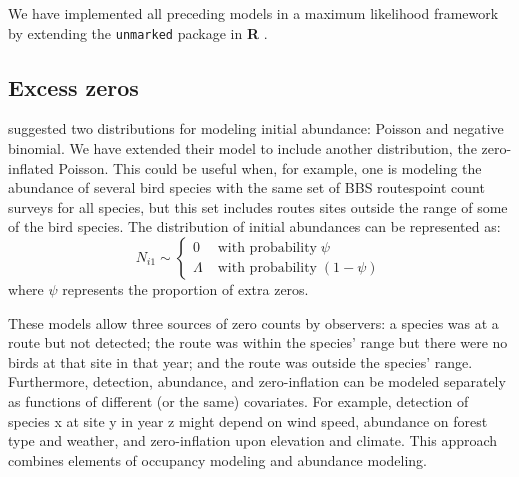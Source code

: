 \documentclass[12pt]{article}
\begin{document}
We have implemented all preceding models in
a maximum likelihood framework by extending the
\texttt{unmarked} package
\citep{fiske_chandler:2011} in \textbf{R} \citep{R-2012}.


\subsection{Excess zeros}

\citet{dail_madsen:2011} suggested two distributions for
modeling
initial abundance: Poisson and negative binomial. We have
extended
their model to include another distribution, the zero-inflated
Poisson. This could be useful when, for example, one is modeling
the
abundance of several bird species with the same set of BBS
routespoint
count surveys for all species, but this set includes routes
sites
outside the range of some of the bird species. The distribution
of
initial abundances can be represented as:
\begin{equation}
N_{i1} \sim \left\{
\begin{aligned}
0 &\; \text{with probability} \; \psi \\
\Lambda &\; \text{with probability} \; (1-\psi)
\end{aligned} \right.
\label{eq:ZIP}
\end{equation}
where $\psi$ represents the proportion of extra zeros.

These models allow three sources of zero counts by observers: a
species was at a route but not detected; the route was within the
species' range but there were no birds at that site in that
year; and the route was outside the species' range. Furthermore,
detection, abundance, and zero-inflation can be modeled separately as
functions of different (or the same) covariates. For example, detection of
species x at site y in year z might depend on wind speed,
abundance on forest type and weather, and zero-inflation upon elevation and
climate.  This approach combines elements of occupancy modeling
\citep{mackenzie_etal:2006} and abundance modeling.

\end{document}
